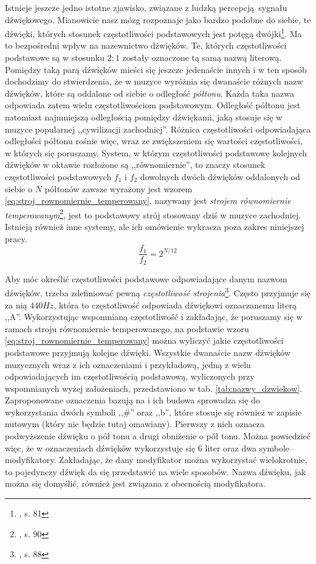 Istnieje jeszcze jedno istotne zjawisko, związane z ludzką percepcją sygnału dźwiękowego. Mianowicie nasz mózg rozpoznaje jako bardzo podobne do siebie, te dźwięki, których stosunek częstotliwości podstawowych jest potęgą dwójki\footnote{\cite{lerch_introduction_2012}, s. 81}. Ma to bezpośredni wpływ na nazewnictwo dźwięków. Te, których częstotliwości podstawowe są w stosunku $2:1$ zostały oznaczone tą samą nazwą literową. Pomiędzy taką parą dźwięków mieści się jeszcze jedenaście innych i w ten sposób dochodzimy do stwierdzenia, że w muzyce wyróżnia się dwanaście różnych nazw dźwięków, które są oddalone od siebie o odległość \emph{półtonu}. Każda taka nazwa odpowiada zatem wielu częstotliwościom podstawowym. Odległość półtonu jest natomiast najmniejszą odległością pomiędzy dźwiękami, jaką stosuje się w muzyce popularnej ,,cywilizacji zachodniej''. Różnica częstotliwości odpowiadająca odległości półtonu rośnie więc, wraz ze zwiększeniem się wartości częstotliwości, w których się poruszamy. System, w którym częstotliwości podstawowe kolejnych dźwięków w oktawie rozłożone są ,,równomiernie'', to znaczy stosunek częstotliwości podstawowych $f_1$ i $f_2$ dowolnych dwóch dźwięków oddalonych od siebie o $N$ półtonów zawsze wyrażony jest wzorem \ref{eq:stroj_rownomiernie_temperowany}, nazywany jest \emph{strojem równomiernie temperowanym}\footnote{\cite{lerch_introduction_2012}, s. 90}, jest to podstawowy strój stosowany dziś w muzyce zachodniej. Istnieją również inne systemy, ale ich omówienie wykracza poza zakres niniejszej pracy.
\begin{equation} \label{eq:stroj_rownomiernie_temperowany}
    \frac{f_1}{f_2} = 2^{N/12}
\end{equation}

Aby móc określić częstotliwości podstawowe odpowiadające danym nazwom dźwięków, trzeba zdefiniować pewną \emph{częstotliwość strojenia}\footnote{\cite{lerch_introduction_2012}, s. 88}. Często przyjmuje się za nią $440Hz$, która to częstotliwość odpowiada dźwiękowi oznaczanemu literą ,,A''. Wykorzystując wspomnianą częstotliwość i zakładając, że poruszamy się w ramach stroju równomiernie temperowanego, na podstawie wzoru \ref{eq:stroj_rownomiernie_temperowany} można wyliczyć jakie częstotliwości podstawowe przyjmują kolejne dźwięki. Wszystkie dwanaście nazw dźwięków muzycznych wraz z ich oznaczeniami i przykładową, jedną z wielu odpowiadających im częstotliwością podstawową, wyliczonych przy wspomnianych wyżej założeniach, przedstawiono w tab. \ref{tab:nazwy_dzwiekow}. Zaproponowane oznaczenia bazują na \cite{lerch_introduction_2012} i ich budowa sprowadza się do wykorzystania dwóch symboli ,,\#'' oraz ,,b'', które stosuje się również w zapisie nutowym (który nie będzie tutaj omawiany). Pierwszy z nich oznacza podwyższenie dźwięku o pół tonu a drugi obniżenie o pół tonu. Można powiedzieć więc, że w oznaczeniach dźwięków wykorzystuje się 6 liter oraz dwa symbole--modyfikatory. Zakładając, że dany modyfikator można wykorzystać wielokrotnie, to pojedynczy dźwięk da się przedstawić na wiele sposobów.  Nazwa dźwięku, jak można się domyślić, również jest związana z obecnością modyfikatora.

